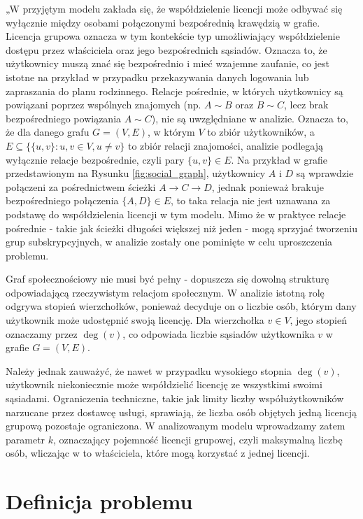 „W przyjętym modelu zakłada się, że współdzielenie licencji może odbywać się wyłącznie między osobami połączonymi bezpośrednią krawędzią w grafie. Licencja grupowa oznacza w tym kontekście typ umożliwiający współdzielenie dostępu przez właściciela oraz jego bezpośrednich sąsiadów. Oznacza to, że użytkownicy muszą znać się bezpośrednio i mieć wzajemne zaufanie, co jest istotne na przykład w przypadku przekazywania danych logowania lub zapraszania do planu rodzinnego. Relacje pośrednie, w których użytkownicy są powiązani poprzez wspólnych znajomych (np. \( A \sim B \) oraz \( B \sim C \), lecz brak bezpośredniego powiązania \( A \sim C \)), nie są uwzględniane w analizie. Oznacza to, że dla danego grafu \( G = (V, E) \),
w którym \( V \) to zbiór użytkowników, a \( E \subseteq \{ \{u,v\} : u,v \in V, u \neq v \} \) to zbiór relacji znajomości, analizie podlegają wyłącznie relacje bezpośrednie, czyli pary \( \{u, v\} \in E \).
Na przykład w grafie przedstawionym na Rysunku \ref{fig:social_graph}, użytkownicy \( A \) i \( D \) są wprawdzie połączeni za pośrednictwem ścieżki \( A \rightarrow C \rightarrow D \), jednak ponieważ brakuje bezpośredniego połączenia \( \{A,D\} \in E \), to taka relacja nie jest uznawana za podstawę do współdzielenia licencji w tym modelu.
Mimo że w praktyce relacje pośrednie - takie jak ścieżki długości większej niż jeden - mogą sprzyjać tworzeniu grup subskrypcyjnych, w analizie zostały one pominięte w celu uproszczenia problemu.

Graf społecznościowy nie musi być pełny - dopuszcza się dowolną strukturę odpowiadającą rzeczywistym relacjom społecznym. W analizie istotną rolę odgrywa stopień wierzchołków, ponieważ decyduje on o liczbie osób, którym dany użytkownik może udostępnić swoją licencję. Dla wierzchołka \( v \in V \), jego stopień oznaczamy przez \( \deg(v) \), co odpowiada liczbie sąsiadów użytkownika \( v \) w grafie \( G = (V, E) \).

Należy jednak zauważyć, że nawet w przypadku wysokiego stopnia $\deg(v)$, użytkownik niekoniecznie może współdzielić licencję ze wszystkimi swoimi sąsiadami. Ograniczenia techniczne, takie jak limity liczby współużytkowników narzucane przez dostawcę usługi, sprawiają, że liczba osób objętych jedną licencją grupową pozostaje ograniczona. W analizowanym modelu wprowadzamy zatem parametr $k$, oznaczający pojemność licencji grupowej, czyli maksymalną liczbę osób, wliczając w to właściciela, które mogą korzystać z jednej licencji.



\section{Definicja problemu}\label{sec:model-formal}

